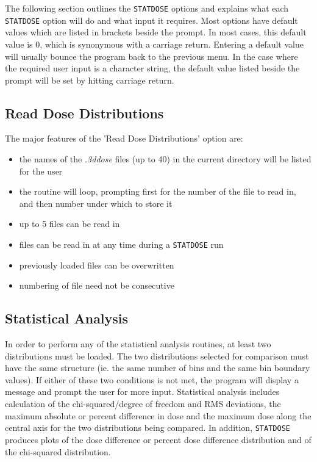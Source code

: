 \documentclass[12pt,twoside]{article}
\begin{document}
The following section outlines the \verb+STATDOSE+ options and explains
what each \verb+STATDOSE+ option will do and what input it requires. Most
options have default values which are listed in brackets beside the
prompt. In most cases, this default value is 0, which is synonymous with a
carriage return. Entering a default value will usually bounce the program
back to the previous menu. In the case where the required user input is a
character string, the default value listed beside the prompt will be set
by hitting carriage return.


\subsection{Read Dose Distributions}

The major features of the 'Read Dose Distributions' option are:

\begin{itemize}
\item the names of the {\em.3ddose} files (up to 40) in the current directory will be listed for the user
\item the routine will loop, prompting first for the number of the
file to read in, and then number under which to store it
\item up to 5 files can be read in
\item files can be read in at any time during a \verb+STATDOSE+ run
\item previously loaded  files can be overwritten
\item numbering of  file need not be consecutive
\end{itemize}

\subsection{Statistical Analysis}

In order to perform any of the statistical analysis routines, at least two
distributions must be loaded. The two distributions selected for
comparison must have the same structure (ie. the same number of bins and
the same bin boundary values). If either of these two conditions is not
met, the program will display a message and prompt the user for more
input. Statistical analysis includes calculation of the chi-squared/degree
of freedom and RMS deviations, the maximum absolute or percent difference in
dose and the
maximum dose along the central axis for the two distributions being
compared.  In addition, \verb+STATDOSE+ produces plots of the dose difference
or percent dose difference distribution and of the chi-squared distribution.
\end{document}
